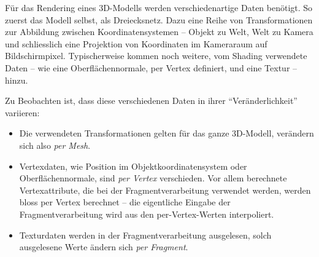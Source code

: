 \documentclass[twoside,a4paper,fleqn,12pt]{book}
\begin{document}
Für das Rendering eines 3D-Modells werden verschiedenartige Daten benötigt. So zuerst das Modell selbst, als Dreiecksnetz. Dazu
eine Reihe von Transformationen zur Abbildung zwischen Koordinatensystemen -- Objekt zu Welt, Welt zu Kamera und schliesslich
eine Projektion von Koordinaten im Kameraraum auf Bildschirmpixel. Typischerweise kommen noch weitere, vom Shading verwendete Daten --
wie eine Oberflächennormale, per Vertex definiert, und eine Textur -- hinzu.

Zu Beobachten ist, dass diese verschiedenen Daten in ihrer "`Veränderlichkeit"' variieren:
\begin{itemize}
\item Die verwendeten Transformationen gelten für das ganze 3D-Modell, verändern sich also \emph{per Mesh}.
\item Vertexdaten, wie Position im Objektkoordinatensystem oder Oberflächennormale, sind \emph{per Vertex}
verschieden. Vor allem berechnete Vertexattribute, die bei der Fragmentverarbeitung verwendet werden, werden
bloss per Vertex berechnet -- die eigentliche Eingabe der Fragmentverarbeitung wird aus den per-Vertex-Werten
interpoliert.
\item Texturdaten werden in der Fragmentverarbeitung ausgelesen, solch ausgelesene Werte ändern sich \emph{per Fragment}.
\end{itemize}
\end{document}
